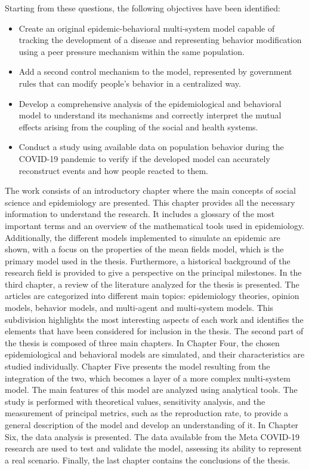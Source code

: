 Starting from these questions, the following objectives have been identified:
\begin{itemize}
	\item Create an original epidemic-behavioral multi-system model capable of tracking the development of a disease and representing behavior modification using a peer pressure mechanism within the same population.
	\item Add a second control mechanism to the model, represented by government rules that can modify people's behavior in a centralized way.
	\item Develop a comprehensive analysis of the epidemiological and behavioral model to understand its mechanisms and correctly interpret the mutual effects arising from the coupling of the social and health systems.
	\item Conduct a study using available data on population behavior during the COVID-19 pandemic to verify if the developed model can accurately reconstruct events and how people reacted to them.
\end{itemize}
The work consists of an introductory chapter where the main concepts of social science and epidemiology are presented. This chapter provides all the necessary information to understand the research. It includes a glossary of the most important terms and an overview of the mathematical tools used in epidemiology. Additionally, the different models implemented to simulate an epidemic are shown, with a focus on the properties of the mean fields model, which is the primary model used in the thesis. Furthermore, a historical background of the research field is provided to give a perspective on the principal milestones.
In the third chapter, a review of the literature analyzed for the thesis is presented. The articles are categorized into different main topics: epidemiology theories, opinion models, behavior models, and multi-agent and multi-system models. This subdivision highlights the most interesting aspects of each work and identifies the elements that have been considered for inclusion in the thesis.
The second part of the thesis is composed of three main chapters. In Chapter Four, the chosen epidemiological and behavioral models are simulated, and their characteristics are studied individually. Chapter Five presents the model resulting from the integration of the two, which becomes a layer of a more complex multi-system model. The main features of this model are analyzed using analytical tools. The study is performed with theoretical values, sensitivity analysis, and the measurement of principal metrics, such as the reproduction rate, to provide a general description of the model and develop an understanding of it.
In Chapter Six, the data analysis is presented. The data available from the Meta COVID-19 research are used to test and validate the model, assessing its ability to represent a real scenario. Finally, the last chapter contains the conclusions of the thesis.
 

